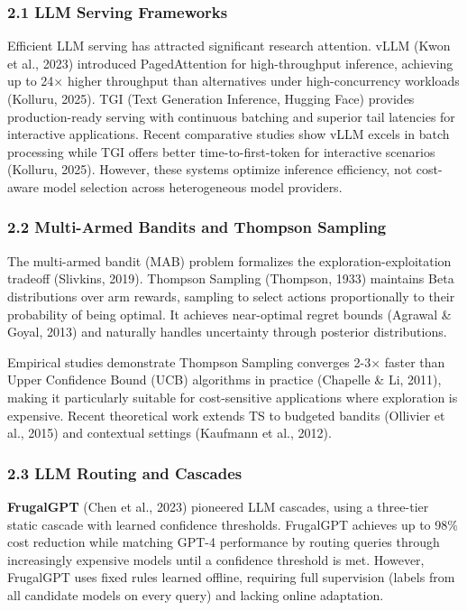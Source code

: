 \documentclass[
]{article}
\begin{document}
\hypertarget{llm-serving-frameworks}{%
\subsubsection{2.1 LLM Serving
Frameworks}\label{llm-serving-frameworks}}

Efficient LLM serving has attracted significant research attention. vLLM
(Kwon et al., 2023) introduced PagedAttention for high-throughput
inference, achieving up to 24× higher throughput than alternatives under
high-concurrency workloads (Kolluru, 2025). TGI (Text Generation
Inference, Hugging Face) provides production-ready serving with
continuous batching and superior tail latencies for interactive
applications. Recent comparative studies show vLLM excels in batch
processing while TGI offers better time-to-first-token for interactive
scenarios (Kolluru, 2025). However, these systems optimize inference
efficiency, not cost-aware model selection across heterogeneous model
providers.

\hypertarget{multi-armed-bandits-and-thompson-sampling}{%
\subsubsection{2.2 Multi-Armed Bandits and Thompson
Sampling}\label{multi-armed-bandits-and-thompson-sampling}}

The multi-armed bandit (MAB) problem formalizes the
exploration-exploitation tradeoff (Slivkins, 2019). Thompson Sampling
(Thompson, 1933) maintains Beta distributions over arm rewards, sampling
to select actions proportionally to their probability of being optimal.
It achieves near-optimal regret bounds (Agrawal \& Goyal, 2013) and
naturally handles uncertainty through posterior distributions.

Empirical studies demonstrate Thompson Sampling converges 2-3× faster
than Upper Confidence Bound (UCB) algorithms in practice (Chapelle \&
Li, 2011), making it particularly suitable for cost-sensitive
applications where exploration is expensive. Recent theoretical work
extends TS to budgeted bandits (Ollivier et al., 2015) and contextual
settings (Kaufmann et al., 2012).

\hypertarget{llm-routing-and-cascades}{%
\subsubsection{2.3 LLM Routing and
Cascades}\label{llm-routing-and-cascades}}

\textbf{FrugalGPT} (Chen et al., 2023) pioneered LLM cascades, using a
three-tier static cascade with learned confidence thresholds. FrugalGPT
achieves up to 98\% cost reduction while matching GPT-4 performance by
routing queries through increasingly expensive models until a confidence
threshold is met. However, FrugalGPT uses fixed rules learned offline,
requiring full supervision (labels from all candidate models on every
query) and lacking online adaptation.
\end{document}
